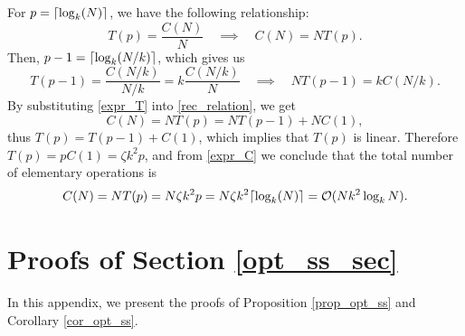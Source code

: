 \documentclass[journal,letterpaper,onecolumn,twoside,nofonttune]{IEEEtran}
\newcommand{\ow}{\mathcal{O}}
\DeclarePairedDelimiter\ceil{\lceil}{\rceil}
\begin{document}
For $p=\ceil{\log_k(N)}$, we have the following relationship:
\begin{equation}
\label{expr_C}
  T(p) = \frac{C(N)}{N} \quad \implies \quad C(N) = NT(p).
\end{equation}
Then, $p-1=\ceil{\log_k(N/k)}$, which gives us
\begin{equation}
\label{expr_T}
  T(p-1)=\frac{C(N/k)}{N/k}=k\frac{C(N/k)}{N} \quad \implies \quad NT(p-1) = kC(N/k) .
\end{equation}
By substituting \eqref{expr_T} into \eqref{rec_relation}, we get
$$ C(N) = NT(p) = NT(p-1)+NC(1), $$
thus $T(p)=T(p-1)+C(1)$, which implies that $T(p)$ is linear. Therefore
$T(p)=pC(1)=\zeta k^2p$, and from \eqref{expr_C} we conclude that the total number of elementary operations is
$$ C(N) = NT(p) = N\zeta k^2p = N\zeta k^2\ceil{\log_k(N)} = \ow(Nk^2\log_k N). $$

\section{Proofs of Section \ref{opt_ss_sec}}

In this appendix, we present the proofs of Proposition \ref{prop_opt_ss} and Corollary \ref{cor_opt_ss}.
\end{document}
